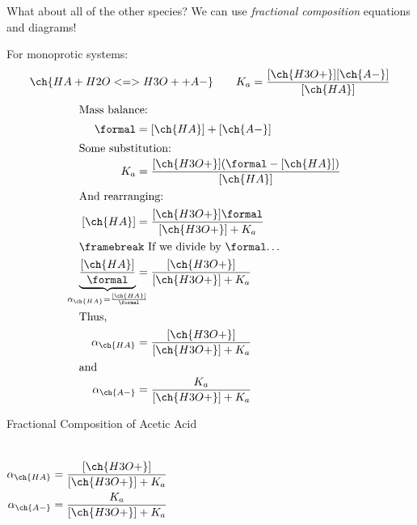 \documentclass[notes=show]{beamer}
\begin{document}
\begin{frame}[allowframebreaks]{What about all of the other species?}
	We can use \emph{fractional composition} equations and diagrams!

	\bigskip

	For monoprotic systems: 
	\begin{align*}
		\ch{HA + H2O <=> H3O+ + A-} \qquad K_a =
		\frac{[\ch{H3O+}][\ch{A-}]}{[\ch{HA}]}
	\end{align*}
	\begin{align*}
		\shortintertext{Mass balance:}
		\si{\formal} &= [\ch{HA}] + [\ch{A-}] \\
		\shortintertext{Some substitution:}
		K_a &= \frac{[\ch{H3O+}](\si{\formal} - [\ch{HA}])}{[\ch{HA}]}
		\\
		\shortintertext{And rearranging:}
		[\ch{HA}] &= \frac{[\ch{H3O+}]\si{\formal}}{[\ch{H3O+}] + K_a}
		\\
		\shortintertext{\framebreak If we divide by \si{\formal}\ldots}
		\underbrace{\frac{[\ch{HA}]}{\si{\formal}}}_{\mathclap{\alpha_{\ch{HA}}
		= \frac{[\ch{HA}]}{\si{\formal}}}}%
		&= \frac{[\ch{H3O+}]}{[\ch{H3O+}] + K_a} \\
		\shortintertext{Thus,}
		\alpha_{\ch{HA}} &= \frac{[\ch{H3O+}]}{[\ch{H3O+}] + K_a} \\
		\shortintertext{and}
		\alpha_{\ch{A-}} &= \frac{K_a}{[\ch{H3O+}] + K_a}
	\end{align*}
\end{frame}

\begin{frame}{Fractional Composition of Acetic Acid}
	\begin{columns}
		\begin{align*}
			\alpha_{\ch{HA}} &= \frac{[\ch{H3O+}]}{[\ch{H3O+}] +
			K_a} \\
			\alpha_{\ch{A-}} &= \frac{K_a}{[\ch{H3O+}] + K_a}
		\end{align*}
		\begin{center}
		
		\end{center}
	\end{columns}
\end{frame}
\end{document}
